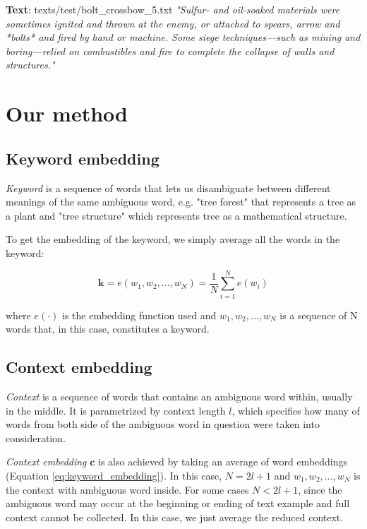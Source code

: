 \documentclass{llncs}
\begin{document}
\smallskip
\textbf{Text}: texts/test/bolt\_crossbow\_5.txt\newline
\textit{"Sulfur- and oil-soaked materials were sometimes ignited and thrown at the enemy, or attached to spears, arrow and *bolts* and fired by hand or machine. Some siege techniques—such as mining and boring—relied on combustibles and fire to complete the collapse of walls and structures."}

\section{Our method}
\subsection{Keyword embedding}
\label{sec:kw_embed}
\textit{Keyword} is a sequence of words that lets us disambiguate between different meanings of the same ambiguous word, e.g. "tree forest" that represents a tree as a plant and "tree structure" which represents tree as a mathematical structure.

To get the embedding of the keyword, we simply average all the words in the keyword:

\begin{equation}
    \label{eq:keyword_embedding}
    \bm{k} = e(w_1, w_2, ..., w_N) = \frac{1}{N}\sum_{i=1}^{N} e(w_i)
\end{equation}

where \(e(\cdot)\) is the embedding function used and \(w_1, w_2, ..., w_N\) is a sequence of N words that, in this case, constitutes a keyword.

\subsection{Context embedding}
\label{sec:ctx_embed}
\textit{Context} is a sequence of words that contains an ambiguous word within, usually in the middle.
It is parametrized by context length \(l\), which specifies how many of words from both side of the ambiguous word in question were taken into consideration.

\textit{Context embedding} \(\bm{c}\) is also achieved by taking an average of word embeddings (Equation \ref{eq:keyword_embedding}).
In this case, \(N = 2l + 1\) and \(w_1, w_2, ..., w_N\) is the context with ambiguous word inside. For some cases \(N < 2l + 1\), since the ambiguous word may occur at the beginning or ending of text example and full context cannot be collected.
In this case, we just average the reduced context.
\end{document}
